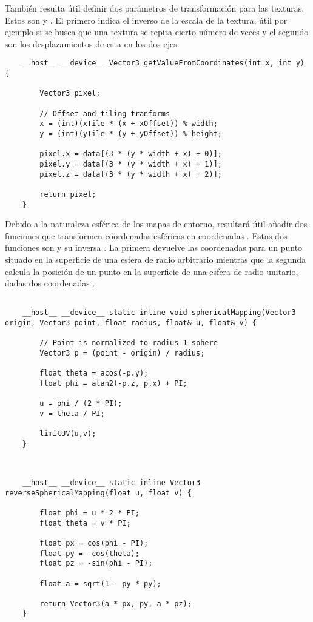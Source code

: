 	También resulta útil definir dos parámetros de transformación para las texturas. Estos son  y . El primero indica el inverso de la escala de la textura, útil por ejemplo si se busca que una textura se repita cierto número de veces y el segundo son los desplazamientos de esta en los dos ejes.

	\begin{lstlisting}
	__host__ __device__ Vector3 getValueFromCoordinates(int x, int y) {
	
        Vector3 pixel;

        // Offset and tiling tranforms
        x = (int)(xTile * (x + xOffset)) % width;
        y = (int)(yTile * (y + yOffset)) % height;

        pixel.x = data[(3 * (y * width + x) + 0)];
        pixel.y = data[(3 * (y * width + x) + 1)];
        pixel.z = data[(3 * (y * width + x) + 2)];

        return pixel;
    }
	\end{lstlisting}

	
	Debido a la naturaleza esférica de los mapas de entorno, resultará útil añadir dos funciones que transformen coordenadas esféricas en coordenadas . Estas dos funciones son  y su inversa . La primera devuelve las coordenadas  para un punto situado en la superficie de una esfera de radio arbitrario mientras que la segunda calcula la posición de un punto en la superficie de una esfera de radio unitario, dadas dos coordenadas .

	\begin{lstlisting}
	
    __host__ __device__ static inline void sphericalMapping(Vector3 origin, Vector3 point, float radius, float& u, float& v) {

        // Point is normalized to radius 1 sphere
        Vector3 p = (point - origin) / radius;

        float theta = acos(-p.y);
        float phi = atan2(-p.z, p.x) + PI;

        u = phi / (2 * PI);
        v = theta / PI;

        limitUV(u,v);
    }
	
	\end{lstlisting}
	
	\begin{lstlisting}
		
	__host__ __device__ static inline Vector3 reverseSphericalMapping(float u, float v) {

        float phi = u * 2 * PI;
        float theta = v * PI;

        float px = cos(phi - PI);
        float py = -cos(theta);
        float pz = -sin(phi - PI);

        float a = sqrt(1 - py * py);

        return Vector3(a * px, py, a * pz);
    }
	
	\end{lstlisting}
	



